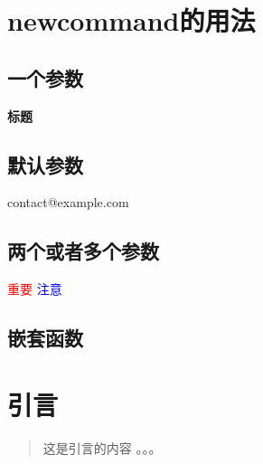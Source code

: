 \documentclass[UTF8]{ctexart}
\makeatletter
\newcommand{\keyword}[1]{\textbf{#1}} %
\newcommand{\myemail}{contact@example.com}
\newcommand{\highlight}[2][red]{\textcolor{#1}{#2}}
\newcommand{\sectionWithQuote}[2]{
  \section{#1}
  \begin{quote}
    #2
  \end{quote}
}
\makeatother
\begin{document}
\section{newcommand的用法}

\subsection{一个参数}
\keyword{标题}


\subsection{默认参数}
\myemail

\subsection{两个或者多个参数}
\highlight{重要}
\highlight[blue]{注意}


\subsection{嵌套函数}
\sectionWithQuote{引言}{这是引言的内容 。。。}
\end{document}
